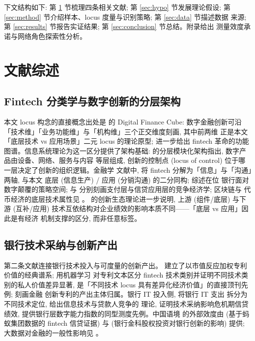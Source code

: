 下文结构如下: 第 \ref{sec:lit} 节梳理四条相关文献; 第 \ref{sec:hypo} 节发展理论假设;
第 \ref{sec:method} 节介绍样本、locus 度量与识别策略; 第 \ref{sec:data} 节描述数据
来源; 第 \ref{sec:results} 节报告实证结果; 第 \ref{sec:conclusion} 节总结。附录给出
测量效度承诺与网络角色探索性分析。

\section{文献综述}\label{sec:lit}

\subsection{Fintech 分类学与数字创新的分层架构}

本文 locus 构念的直接概念出处是 \textcite{gomber2017cube} 的 Digital Finance Cube:
数字金融创新可沿「技术维」「业务功能维」与「机构维」三个正交维度刻画, 其中前两维
正是本文「底层技术 vs 应用场景」二元 locus 的理论原型; \textcite{gomber2018fintech}
进一步给出 fintech 革命的功能图谱。信息系统理论为这一区分提供了架构基础:
\textcite{yoo2010layered} 的分层模块化架构指出, 数字产品由设备、网络、服务与内容
等层组成, 创新的控制点 (locus of control) 位于哪一层决定了创新的组织逻辑。金融学
文献中, \textcite{boot2021fintech} 将 fintech 分解为「信息」与「沟通」两轴, 与本文
底层 (信息生产) / 应用 (分销沟通) 的二分同构; \textcite{vives2019digital} 综述在位
银行面对数字颠覆的策略空间; \textcite{parlour2022payments} 与
\textcite{berg2022fintechlending} 分别刻画支付层与信贷应用层的竞争经济学; 区块链与
代币经济的底层技术属性见 \parencite{conghe2019blockchain,cong2021tokenomics}。
\textcite{adner2010ecosystem} 的创新生态理论进一步说明, 上游 (组件/底层) 与下游
(互补/应用) 技术互依结构对企业绩效的影响本质不同——「底层 vs 应用」因此是有经济
机制支撑的区分, 而非任意标签。

\subsection{银行技术采纳与创新产出}

第二条文献连接银行技术投入与可度量的创新产出。\textcite{kogan2017technological}
建立了以市值反应加权专利价值的经典谱系; \textcite{chen2019fintechvalue} 用机器学习
对专利文本区分 fintech 技术类别并证明不同技术类别的私人价值差异显著, 是「不同技术
locus 具有差异化经济价值」的直接顶刊先例; \textcite{lerner2024finpatents} 刻画金融
创新专利的产出主体归属。银行 IT 投入侧, \textcite{he2026lendingit} 将银行 IT 支出
拆分为不同技术定位, \textcite{vivesye2025itcompetition} 给出信息技术与贷款人竞争的
理论, \textcite{pierri2022techbanking} 证明技术采纳影响危机期信贷绩效,
\textcite{kwan2024digitalcapability} 提供银行层数字能力指数的同型测度先例。中国语境
的外部效度由 \textcite{hau2024fintechcredit} (基于蚂蚁集团数据的 fintech 信贷证据)
与 \textcite{alfhaili2026fintechequity} (银行金科股权投资对银行创新的影响) 提供;
大数据对金融的一般性影响见 \parencite{goldstein2021bigdata,goldstein2019fintech}。

